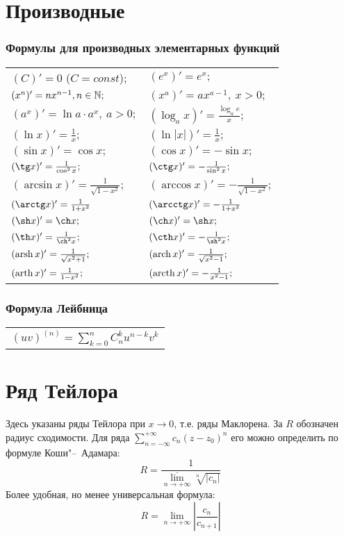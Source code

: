 \section{Производные}

\subsubsection{Формулы для производных элементарных функций}
\begin{longtable}[l]{l l}
$(C)'=0$ ($C=const$); 
&
$(e^x)'=e^x;$
\\
$(x^n)' = nx^{n-1}, n\in \mathbb{N};$
&
$(x^a)'=ax^{a-1},\ x>0;$
\\
$(a^x)'=\ln a\cdot a^x,\ a>0;$
&
$(\log_a x)'=\frac{\log_a e}{x};$%
\\
$(\ln x)' = \frac{1}{x};$%
&
$(\ln |x|)' = \frac{1}{x};$%
\\
$(\sin x)'=\cos x;$
&
$(\cos x)'=-\sin x;$
\\
$(\tg x)'= \frac{1}{\cos^2 x};$%
&
$(\ctg x)'= -\frac{1}{\sin^2 x};$ 
\\
$(\arcsin x)' = \frac{1}{\sqrt{1-x^2}};$
&
$(\arccos x)' = -\frac{1}{\sqrt{1-x^2}};$
\\
$(\arctg x)' = \frac{1}{1+x^2}$
&
$(\arcctg x)' = -\frac{1}{1+x^2}$
\\
$(\sh x)'= \ch x;$
&
$(\ch x)'= \sh x;$
\\
$(\th x)'= \frac{1}{\ch^2 x};$
&
$(\cth x)'= -\frac{1}{\sh^2 x};$
\\
$(\operatorname{arsh} x)'=\frac{1}{\sqrt{x^2+1}};$
&
$(\operatorname{arch} x)'=\frac{1}{\sqrt{x^2-1}};$
\\
$(\operatorname{arth} x)'=\frac{1}{1-x^2};$
&
$(\operatorname{arcth} x)'=-\frac{1}{x^2-1};$
\end{longtable}

\subsubsection{Формула Лейбница}
\begin{longtable}[l]{l}
$(uv)^{(n)}=\sum\limits^n_{k=0} C^k_n u^{n-k} v^{k}$
\end{longtable}

\section{Ряд Тейлора}

\begin{notion}
Здесь указаны ряды Тейлора при $x \to 0$, т.е. ряды Маклорена. За $R$ обозначен радиус сходимости. Для ряда $\sum\limits_{n=-\infty}^{+\infty} c_n (z-z_0)^n $ его можно определить по формуле Коши"--~Адамара:
$$
R = \frac{1}{\overline{\lim\limits_{n \to + \infty}} \sqrt[n]{|c_n|}}
$$
Более удобная, но менее универсальная формула:$$
R = \lim\limits_{n \to + \infty} \left| \frac{c_n}{c_{n + 1}} \right|
$$
\end{notion}

